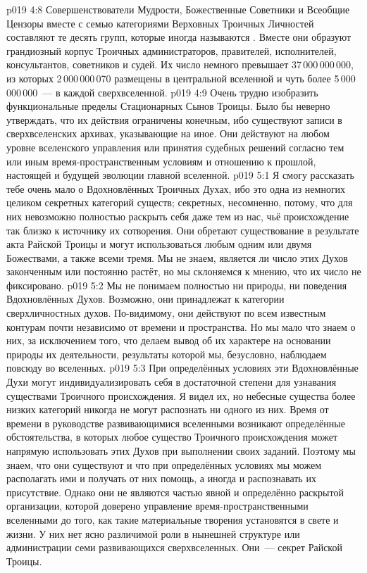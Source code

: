 \vs p019 4:8 \pc Совершенствователи Мудрости, Божественные Советники и Всеобщие Цензоры вместе с семью категориями Верховных Троичных Личностей составляют те десять групп, которые иногда называются . Вместе они образуют грандиозный корпус Троичных администраторов, правителей, исполнителей, консультантов, советников и судей. Их число немного превышает 37\,000\,000\,000, из которых 2\,000\,000\,070 размещены в центральной вселенной и чуть более 5\,000\,000\,000~--- в каждой сверхвселенной.
\vs p019 4:9 Очень трудно изобразить функциональные пределы Стационарных Сынов Троицы. Было бы неверно утверждать, что их действия ограничены конечным, ибо существуют записи в сверхвселенских архивах, указывающие на иное. Они действуют на любом уровне вселенского управления или принятия судебных решений согласно тем или иным время\hyp{}пространственным условиям и отношению к прошлой, настоящей и будущей эволюции главной вселенной.
\vs p019 5:1 Я смогу рассказать тебе очень мало о Вдохновлённых Троичных Духах, ибо это одна из немногих целиком секретных категорий существ; секретных, несомненно, потому, что для них невозможно полностью раскрыть себя даже тем из нас, чьё происхождение так близко к источнику их сотворения. Они обретают существование в результате акта Райской Троицы и могут использоваться любым одним или двумя Божествами, а также всеми тремя. Мы не знаем, является ли число этих Духов законченным или постоянно растёт, но мы склоняемся к мнению, что их число не фиксировано.
\vs p019 5:2 Мы не понимаем полностью ни природы, ни поведения Вдохновлённых Духов. Возможно, они принадлежат к категории сверхличностных духов. По\hyp{}видимому, они действуют по всем известным контурам почти независимо от времени и пространства. Но мы мало что знаем о них, за исключением того, что делаем вывод об их характере на основании природы их деятельности, результаты которой мы, безусловно, наблюдаем повсюду во вселенных.
\vs p019 5:3 При определённых условиях эти Вдохновлённые Духи могут индивидуализировать себя в достаточной степени для узнавания существами Троичного происхождения. Я видел их, но небесные существа более низких категорий никогда не могут распознать ни одного из них. Время от времени в руководстве развивающимися вселенными возникают определённые обстоятельства, в которых любое существо Троичного происхождения может напрямую использовать этих Духов при выполнении своих заданий. Поэтому мы знаем, что они существуют и что при определённых условиях мы можем располагать ими и получать от них помощь, а иногда и распознавать их присутствие. Однако они не являются частью явной и определённо раскрытой организации, которой доверено управление время\hyp{}пространственными вселенными до того, как такие материальные творения установятся в свете и жизни. У них нет ясно различимой роли в нынешней структуре или администрации семи развивающихся сверхвселенных. Они~--- секрет Райской Троицы.

